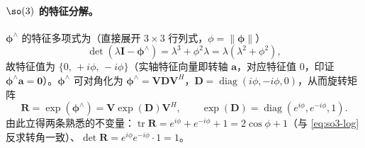 \paragraph{$\so(3)$ 的特征分解。}$\boldsymbol{\phi}^\wedge$ 的特征多项式为（直接展开 $3\times3$ 行列式，$\phi=\|\boldsymbol{\phi}\|$）
\begin{equation}
  \det(\lambda\mathbf{I}-\boldsymbol{\phi}^\wedge)=\lambda^3+\phi^2\lambda=\lambda(\lambda^2+\phi^2),
  \label{eq:so3-charpoly}
\end{equation}
故特征值为 $\{0,\,+i\phi,\,-i\phi\}$（实轴特征向量即转轴 $\mathbf{a}$，对应特征值 $0$，印证 $\boldsymbol{\phi}^\wedge\mathbf{a}=\mathbf{0}$）。$\boldsymbol{\phi}^\wedge$ 可对角化为 $\boldsymbol{\phi}^\wedge=\mathbf{V}\mathbf{D}\mathbf{V}^{H}$，$\mathbf{D}=\operatorname{diag}(i\phi,-i\phi,0)$，从而旋转矩阵
\begin{equation}
  \mathbf{R}=\exp(\boldsymbol{\phi}^\wedge)=\mathbf{V}\exp(\mathbf{D})\mathbf{V}^{H},\qquad
  \exp(\mathbf{D})=\operatorname{diag}(e^{i\phi},e^{-i\phi},1).
  \label{eq:so3-eigen}
\end{equation}
由此立得两条熟悉的不变量：$\operatorname{tr}\mathbf{R}=e^{i\phi}+e^{-i\phi}+1=2\cos\phi+1$（与 \cref{eq:so3-log} 反求转角一致）、$\det\mathbf{R}=e^{i\phi}e^{-i\phi}\cdot1=1$。

